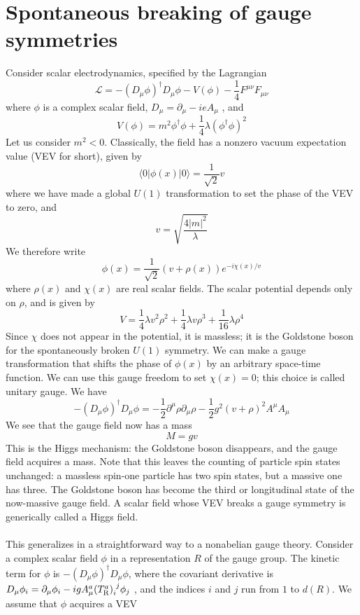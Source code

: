 \section{Spontaneous breaking of gauge symmetries}
Consider scalar electrodynamics, specified by the Lagrangian
\[\mathcal{L} = -(D_{\mu}\phi)^{\dagger}D_{\mu}\phi - V(\phi) - \frac{1}{4}F^{\mu\nu}F_{\mu\nu}\]
where $\phi$ is a complex scalar field, $D_{\mu} = \partial_{\mu} - ieA_{\mu}$ , and
\[V(\phi) = m^2\phi^{\dagger}\phi + \frac{1}{4}\lambda (\phi^{\dagger}\phi)^2\]
Let us consider $m^2 < 0$. Classically, the field has a nonzero vacuum expectation value (VEV for short), given by
\[\langle 0 | \phi(x) | 0 \rangle = \frac{1}{\sqrt{2}}v\]
where we have made a global $U(1)$ transformation to set the phase of the VEV to zero, and
\[v = \sqrt{\frac{4|m|^2}{\lambda}}\]
We therefore write
\[\phi(x) = \frac{1}{\sqrt{2}} (v + \rho(x)) e^{-i\chi(x)/v}\]
where $\rho(x)$ and $\chi(x)$ are real scalar fields. The scalar potential depends only on $\rho$, and is given by
\[V = \frac{1}{4}\lambda v^2\rho^2 + \frac{1}{4}\lambda v \rho^3 + \frac{1}{16}\lambda \rho^4\]
Since $\chi$ does not appear in the potential, it is massless; it is the Goldstone boson for the spontaneously broken $U(1)$ symmetry.
We can make a gauge transformation that shifts the phase of $\phi(x)$ by an arbitrary space-time function.
We can use this gauge freedom to set $\chi(x) = 0$; this choice is called unitary gauge.
We have
\[-(D_{\mu}\phi)^{\dagger}D_{\mu}\phi = -\frac{1}{2}\partial^{\mu}\rho \partial_{\mu}\rho - \frac{1}{2}g^2(v+\rho)^2 A^{\mu}A_{\mu}\]
We see that the gauge field now has a mass
\[M = gv\]
This is the Higgs mechanism: the Goldstone boson disappears, and the gauge field acquires a mass. Note that this leaves the counting of particle spin states unchanged: a massless spin-one particle has two spin states, but a massive
one has three. The Goldstone boson has become the third or longitudinal state of the now-massive gauge field. A scalar field whose VEV breaks a gauge symmetry is generically called a Higgs field.
\\ \\
This generalizes in a straightforward way to a nonabelian gauge theory. Consider a complex scalar field $\phi$ in a representation $R$ of the gauge group.
The kinetic term for $\phi$ is $-(D_{\mu}\phi)^{\dagger}D_{\mu}\phi$, where the covariant derivative is $D_{\mu}\phi_i = \partial_{\mu}\phi_i - igA^a_{\mu}(T^a_{\rm R})_{i}^{\phantom{i}j} \phi_j$ , and the indices $i$ and $j$ run from $1$ to $d(R)$.
We assume that $\phi$ acquires a VEV
